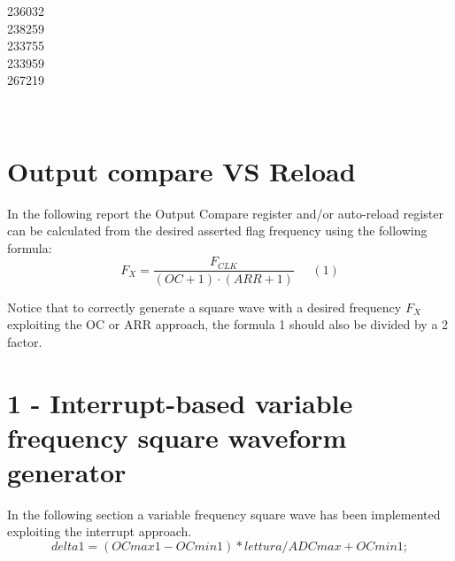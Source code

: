 \documentclass[12pt]{article}
\begin{document}
\begin{titlepage}
\begin{minipage}{0.4\textwidth}
			\begin{flushright} \large
			236032\\													%
			238259\\
            233755\\
            233959\\
            267219\\
            
		\end{flushright}
        
	\end{minipage}\\[2 cm]
	
\end{titlepage}

\newpage
\section*{Output compare VS Reload}
{
	
	In the following report the Output Compare register and/or auto-reload register can be calculated from the desired asserted flag frequency using the following formula:
	\[F_{X}=\frac{F_{CLK}}{(OC+1)\cdot(ARR+1)}\;\;\;\;\; (1)\] 
	
	Notice that to correctly generate a square wave with a desired frequency $F_{X}$ exploiting the OC or ARR approach, the formula 1 should also be divided by a 2 factor.
}

\section*{1 - Interrupt-based variable frequency square waveform generator}

In the following section a variable frequency square wave has been implemented exploiting the interrupt approach. 
\[ delta1 = (OCmax1 - OCmin1) * lettura/ADCmax + OCmin1;\]
 
\end{document}
